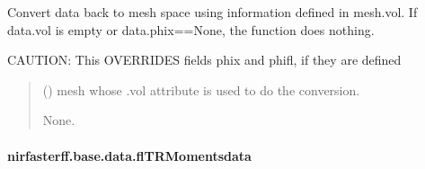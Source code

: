 \documentclass[letterpaper,10pt,english]{sphinxmanual}
\begin{document}
\begin{fulllineitems}
\begin{fulllineitems}
\label{\detokenize{_autosummary/nirfasterff.base.data.flTPSFdata:nirfasterff.base.data.flTPSFdata.tomesh}}
\pysigstartsignatures
\pysiglinewithargsret
{}
{}
{}
\pysigstopsignatures
\sphinxAtStartPar
Convert data back to mesh space using information defined in mesh.vol. If data.vol is empty or data.phix==None, the function does nothing.

\sphinxAtStartPar
CAUTION: This OVERRIDES fields phix and phifl, if they are defined
\begin{quote}\begin{description}
\sphinxAtStartPar
{} () \textendash{} mesh whose .vol attribute is used to do the conversion.

\sphinxAtStartPar
None.

\end{description}\end{quote}

\end{fulllineitems}


\end{fulllineitems}


\sphinxstepscope


\paragraph{nirfasterff.base.data.flTRMomentsdata}
\label{\detokenize{_autosummary/nirfasterff.base.data.flTRMomentsdata:nirfasterff-base-data-fltrmomentsdata}}\label{\detokenize{_autosummary/nirfasterff.base.data.flTRMomentsdata::doc}}
\end{document}
